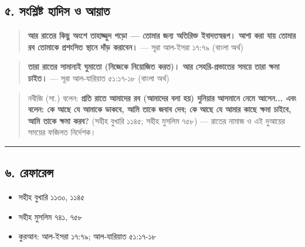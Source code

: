 \subsection*{৫. সংশ্লিষ্ট হাদিস ও আয়াত}

\begin{quote}
\textbf{আর রাতের কিছু অংশে তাহাজ্জুদ পড়ো — তোমার জন্য অতিরিক্ত ইবাদতস্বরূপ। আশা করা যায় তোমার রব তোমাকে প্রশংসিত স্থানে দাঁড় করাবেন।} — সূরা আল-ইসরা ১৭:৭৯ (বাংলা অর্থ)
\end{quote}

\begin{quote}
\textbf{তারা রাতের সামান্যই ঘুমাতো (নিজেকে নিয়োজিত করত)। আর সেহরি-প্রভাতের সময়ে তারা ক্ষমা চাইত।} — সূরা আল-যারিয়াত ৫১:১৭-১৮ (বাংলা অর্থ)
\end{quote}

\begin{quote}
নবীজি (সা.) বলেন: \textbf{প্রতি রাতে আমাদের রব (আমাদের বলা হয়) দুনিয়ার আসমানে নেমে আসেন... এবং বলেন: কে আছে যে আমাকে ডাকবে, আমি তাকে জবাব দেব; কে আছে যে আমার কাছে ক্ষমা চাইবে, আমি তাকে ক্ষমা করব?} (সহীহ বুখারি ১১৪৫; সহীহ মুসলিম ৭৫৮) — রাতের নামাজ ও এই দুআয়ের সময়ের ফজিলত নির্দেশক।
\end{quote}

\medskip\hrule\medskip

\subsection*{৬. রেফারেন্স}

\begin{itemize}
\item সহীহ বুখারি ১১৩০, ১১৪৫
\item সহীহ মুসলিম ৭৪১, ৭৫৮
\item কুরআন: আল-ইসরা ১৭:৭৯; আল-যারিয়াত ৫১:১৭-১৮
\end{itemize}


